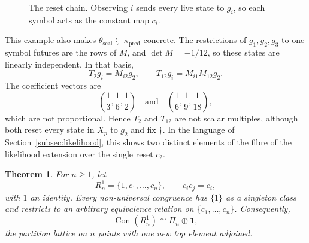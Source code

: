 \documentclass[10pt]{article}
\newtheorem{theorem}{Theorem}[section]
\theoremstyle{definition}
\theoremstyle{remark}
\newcommand{\Con}{\operatorname{Con}}
\newcommand{\eps}{\varepsilon}
\begin{document}
\begin{figure}[ht]
\centering
{}
\caption{The reset chain.  Observing $i$ sends every live state to
$g_i$, so each symbol acts as the constant map $c_i$.}
\label{fig:reset}
\end{figure}

This example also makes
$\theta_{\mathrm{scal}}\subsetneq\kappa_{\mathrm{pred}}$ concrete.  The
restrictions of $g_1,g_2,g_3$ to one symbol futures are the rows of $M$, and
$\det M=-1/12$, so these states are linearly independent.  In that basis,
\[
  T_2g_i=M_{i2}g_2,
  \qquad
  T_{12}g_i=M_{i1}M_{12}g_2.
\]
The coefficient vectors are
\[
  \left(\frac13,\frac16,\frac12\right)
  \quad\text{and}\quad
  \left(\frac16,\frac19,\frac1{18}\right),
\]
which are not proportional.  Hence $T_2$ and $T_{12}$ are not scalar
multiples, although both reset every state in $X_p$ to $g_2$ and fix
$\dagger$.
In the language of Section~\ref{subsec:likelihood}, this shows two
distinct elements of the fibre of the likelihood extension over the
single reset $c_2$.

\begin{theorem}
\label{thm:reset-con}
For $n\ge1$, let
\[
  R_n^1=\{1,c_1,\ldots,c_n\},
  \qquad c_i c_j=c_i,
\]
with $1$ an identity.  Every non-universal congruence has $\{1\}$ as a singleton
class and restricts to an arbitrary equivalence relation on
$\{c_1,\ldots,c_n\}$.  Consequently,
\[
  \Con(R_n^1)\cong \Pi_n\oplus\mathbf 1,
\]
the partition lattice on $n$ points with one new top element adjoined.
\end{theorem}
\end{document}
